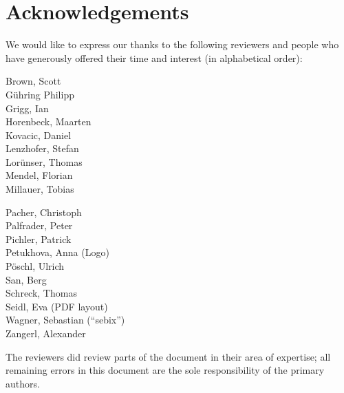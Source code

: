 \newpage
\section*{Acknowledgements}
\label{section:Reviewers}


We would like to express our thanks to the following reviewers and people who have generously offered their time and interest (in alphabetical order):


\vline{}

\begin{minipage}[b]{0.5\linewidth}
\center
Brown, Scott \\
G\"uhring Philipp  \\
Grigg, Ian  \\
Horenbeck, Maarten \\
Kovacic, Daniel \\
Lenzhofer, Stefan \\
Lor\"unser, Thomas \\
Mendel, Florian \\
Millauer, Tobias \\
\end{minipage}
\begin{minipage}[b]{0.5\linewidth}
\center
Pacher, Christoph \\
Palfrader, Peter \\
Pichler, Patrick \\
Petukhova, Anna (Logo) \\
P\"oschl, Ulrich \\
San, Berg \\
Schreck, Thomas  \\
Seidl, Eva (PDF layout) \\
Wagner, Sebastian (``sebix'') \\
Zangerl, Alexander \\
\end{minipage}

\vline{}

The reviewers did review parts of the document in their area of
expertise; all remaining errors in this document are the sole
responsibility of the primary authors.




